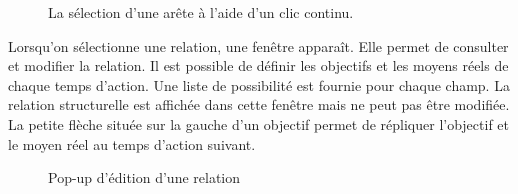 \begin{figure}[h!]
\centering
{}
\caption{La sélection d'une arête à l'aide d'un clic continu.}

\end{figure}

Lorsqu'on sélectionne une relation, une fenêtre apparaît. Elle permet de consulter et modifier la relation. Il est possible de définir les objectifs et les moyens réels de chaque temps d'action. Une liste de possibilité est fournie pour chaque champ. La relation structurelle est affichée dans cette fenêtre mais ne peut pas être modifiée.\\

La petite flèche située sur la gauche d'un objectif permet de répliquer l'objectif et le moyen réel au temps d'action suivant.

\begin{figure}[h!]
\centering
{}
\caption{Pop-up d'édition d'une relation}
\label{edition_relation}
\end{figure}

